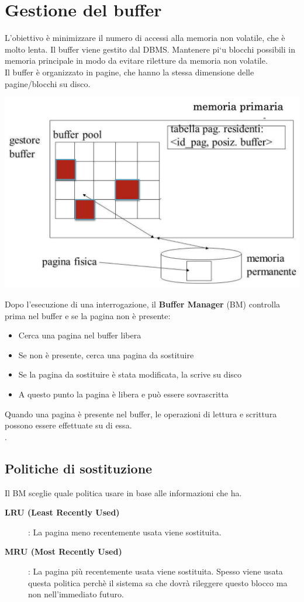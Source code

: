 \documentclass[12pt, a4paper]{report}
\begin{document}
    \section{Gestione del buffer}
    L’obiettivo è minimizzare il numero di accessi alla memoria non volatile, che è molto lenta. Il buffer viene gestito dal DBMS. Mantenere pi`u blocchi possibili in memoria principale in modo da evitare riletture da memoria non volatile.\\
    Il buffer è organizzato in pagine, che hanno la stessa dimensione delle pagine/blocchi su disco.
    \begin{center}
        \includegraphics[width=\textwidth]{Appunti Latex/Immagini/buffer.png}
    \end{center}
    Dopo l'esecuzione di una interrogazione, il \textbf{Buffer Manager} (BM) controlla prima nel buffer e se la pagina non è presente:
    \begin{itemize}
        \item Cerca una pagina nel buffer libera
        \item Se non è presente, cerca una pagina da sostituire
        \item Se la pagina da sostituire è stata modificata, la scrive su disco
        \item A questo punto la pagina è libera e può essere sovrascritta
    \end{itemize}
    Quando una pagina è presente nel buffer, le operazioni di lettura e scrittura possono essere effettuate su di essa.\\
    .
    \subsection{Politiche di sostituzione}
    Il BM sceglie quale politica usare in base alle informazioni che ha.
    \begin{description}
        \item[\textbf{LRU (Least Recently Used)}]: La pagina meno recentemente usata viene sostituita. 
        \item[\textbf{MRU (Most Recently Used)}]: La pagina più recentemente usata viene sostituita. Spesso viene usata questa politica perchè il sistema sa che dovrà rileggere questo blocco ma non nell'immediato futuro.
    \end{description}
\end{document}
